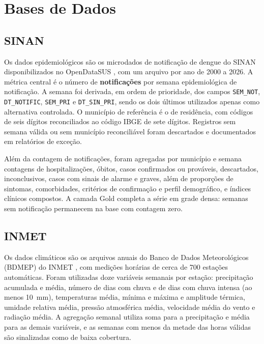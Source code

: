 \section{Bases de Dados}

\subsection{SINAN}
\label{sec:sinan}

Os dados epidemiológicos são os microdados de notificação de dengue do SINAN disponibilizados no OpenDataSUS \cite{sinan2025}, com um arquivo por ano de 2000 a 2026. A métrica central é o número de \textbf{notificações} por semana epidemiológica de notificação. A semana foi derivada, em ordem de prioridade, dos campos \texttt{SEM\_NOT}, \texttt{DT\_NOTIFIC}, \texttt{SEM\_PRI} e \texttt{DT\_SIN\_PRI}, sendo os dois últimos utilizados apenas como alternativa controlada. O município de referência é o de residência, com códigos de seis dígitos reconciliados ao código IBGE de sete dígitos. Registros sem semana válida ou sem município reconciliável foram descartados e documentados em relatórios de exceção.

Além da contagem de notificações, foram agregadas por município e semana contagens de hospitalizações, óbitos, casos confirmados ou prováveis, descartados, inconclusivos, casos com sinais de alarme e graves, além de proporções de sintomas, comorbidades, critérios de confirmação e perfil demográfico, e índices clínicos compostos. A camada Gold completa a série em grade densa: semanas sem notificação permanecem na base com contagem zero.

\subsection{INMET}

Os dados climáticos são os arquivos anuais do Banco de Dados Meteorológicos (BDMEP) do INMET \cite{inmet2025}, com medições horárias de cerca de 700 estações automáticas. Foram utilizadas doze variáveis semanais por estação: precipitação acumulada e média, número de dias com chuva e de dias com chuva intensa (ao menos 10~mm), temperaturas média, mínima e máxima e amplitude térmica, umidade relativa média, pressão atmosférica média, velocidade média do vento e radiação média. A agregação semanal utiliza soma para a precipitação e média para as demais variáveis, e as semanas com menos da metade das horas válidas são sinalizadas como de baixa cobertura.

